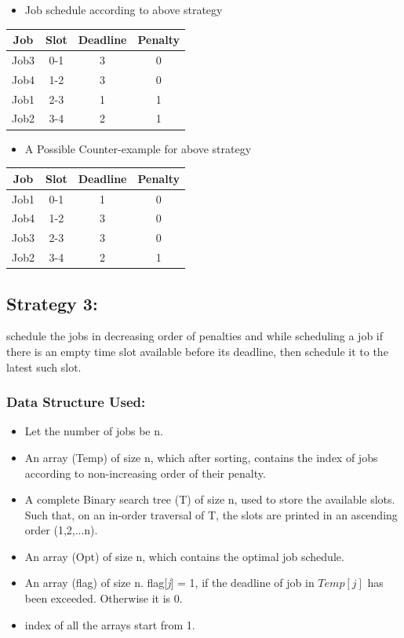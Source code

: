 \documentclass[pdftex,a4paper,12pt]{report}
\begin{document}
\begin{multicols}{2}
\begin{center}
\begin{itemize}
\item Job schedule according to above strategy
\end{itemize}
\begin{tabular}{c|c|c|c}
\hline
Job & Slot & Deadline & Penalty\\
\hline
Job3 & 0-1 & 3 & 0\\
Job4 & 1-2 & 3 & 0\\
Job1 & 2-3 & 1 & 1\\
Job2 & 3-4 & 2 & 1\\
\hline
\end{tabular}
\end{center}

\setlength{\columnseprule}{0.2pt}
\columnbreak
\begin{center}
\begin{itemize}
\item A Possible Counter-example for above strategy
\end{itemize}
\begin{tabular}{c|c|c|c}
\hline
Job & Slot & Deadline & Penalty\\
\hline
Job1 & 0-1 & 1 & 0\\
Job4 & 1-2 & 3 & 0\\
Job3 & 2-3 & 3 & 0\\
Job2 & 3-4 & 2 & 1\\
\hline
\end{tabular}
\end{center}
\end{multicols}
\subsection{Strategy 3:}schedule the jobs in decreasing order of penalties and while scheduling a job if there is an empty time
slot available before its deadline, then schedule it to the latest such slot.
\subsubsection{Data Structure Used:}
\begin{itemize}
\item Let the number of jobs be n.
\item An array (Temp) of size n, which after sorting, contains the index of jobs according to non-increasing order of their penalty.
\item A complete Binary search tree (T) of size n, used to store the available slots. Such that, on an in-order traversal of T, the slots are printed in an ascending order (1,2,...n).\label{tree}
\item An array (Opt) of size n, which contains the optimal job schedule.
\item An array (flag) of size n. flag[\emph{j}] = 1, if the deadline of job in $Temp[j]$ has been exceeded. Otherwise it is 0.
\item index of all the arrays start from 1.
\end{itemize}
\end{document}
